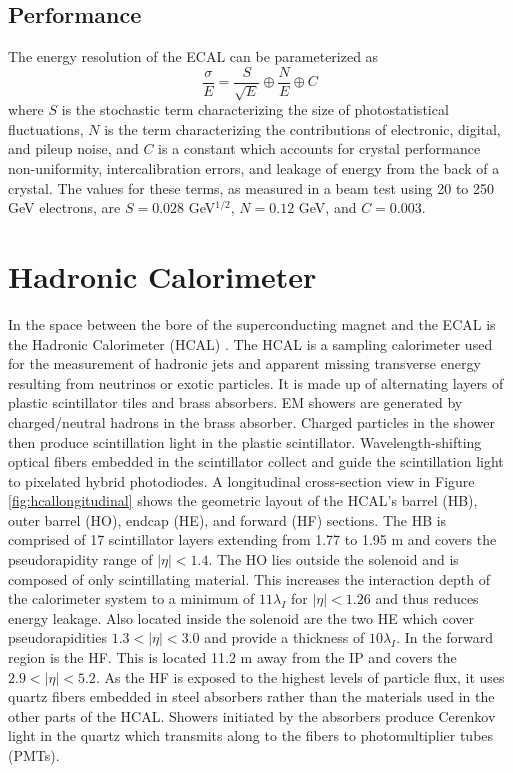 \subsection{Performance}
The energy resolution of the ECAL can be parameterized as 
\begin{equation}
\frac{\sigma}{E} = \frac{S}{\sqrt{E}} \oplus \frac{N}{E} \oplus C
\end{equation}
where $S$ is the stochastic term characterizing the size of photostatistical fluctuations, $N$ is the term characterizing the contributions of electronic, digital, and pileup noise, and $C$ is a constant which accounts for crystal performance non-uniformity, intercalibration errors, and leakage of energy from the back of a crystal.  The values for these terms, as measured in a beam test using 20 to 250 GeV electrons, are $S=0.028$ GeV$^{1/2}$, $N=0.12$ GeV, and $C=0.003$.  \cite{Collaboration_2008}


\section{Hadronic Calorimeter}
In the space between the bore of the superconducting magnet and the ECAL is the Hadronic Calorimeter (HCAL) \cite{CERN-LHCC-97-031}.  The HCAL is a sampling calorimeter used for the measurement of hadronic jets and apparent missing transverse energy resulting from neutrinos or exotic particles. It is made up of alternating layers of plastic scintillator tiles and brass absorbers.  EM showers are generated by charged/neutral hadrons in the brass absorber.  Charged particles in the shower then produce scintillation light in the plastic scintillator.  Wavelength-shifting optical fibers embedded in the scintillator collect and guide the scintillation light to pixelated hybrid photodiodes.  A longitudinal cross-section view in Figure \ref{fig:hcallongitudinal} shows the geometric layout of the HCAL's barrel (HB), outer barrel (HO), endcap (HE), and forward (HF) sections.  The HB is comprised of 17 scintillator layers extending from 1.77 to 1.95 m and covers the pseudorapidity range of $|\eta|<1.4$.  The HO lies outside the solenoid and is composed of only scintillating material.  This increases the interaction depth of the calorimeter system to a minimum of $11\lambda_I$ for $|\eta|<1.26$ and thus reduces energy leakage.  Also located inside the solenoid are the two HE which cover pseudorapidities $1.3<|\eta|<3.0$ and provide a thickness of $10\lambda_I$.  In the forward region is the HF.  This is located 11.2 m away from the IP and covers the $2.9<|\eta|<5.2$.  As the HF is exposed to the highest levels of particle flux, it uses quartz fibers embedded in steel absorbers rather than the materials used in the other parts of the HCAL. Showers initiated by the absorbers produce Cerenkov light in the quartz which transmits along to the fibers to photomultiplier tubes (PMTs).  

